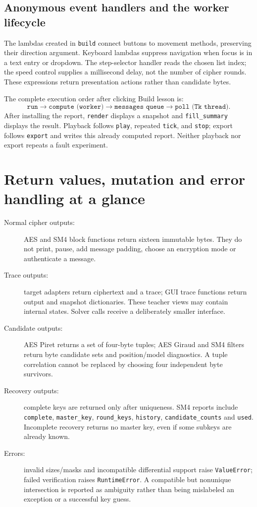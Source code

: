 \subsection{Anonymous event handlers and the worker lifecycle}
The lambdas created in \texttt{build} connect buttons to movement methods, preserving their direction argument. Keyboard lambdas suppress navigation when focus is in a text entry or dropdown. The step-selector handler reads the chosen list index; the speed control supplies a millisecond delay, not the number of cipher rounds. These expressions return presentation actions rather than candidate bytes.

The complete execution order after clicking Build lesson is:
\[
\texttt{run} \longrightarrow \texttt{compute (worker)} \longrightarrow
\texttt{messages queue} \longrightarrow \texttt{poll (Tk thread)}.
\]
After installing the report, \texttt{render} displays a snapshot and \texttt{fill\_\allowbreak{}summary} displays the result. Playback follows \texttt{play}, repeated \texttt{tick}, and \texttt{stop}; export follows \texttt{export} and writes this already computed report. Neither playback nor export repeats a fault experiment.

\section{Return values, mutation and error handling at a glance}
\begin{description}
\item[Normal cipher outputs:] AES and SM4 block functions return sixteen immutable bytes. They do not print, pause, add message padding, choose an encryption mode or authenticate a message.
\item[Trace outputs:] target adapters return ciphertext and a trace; GUI trace functions return output and snapshot dictionaries. These teacher views may contain internal states. Solver calls receive a deliberately smaller interface.
\item[Candidate outputs:] AES Piret returns a set of four-byte tuples; AES Giraud and SM4 filters return byte candidate sets and position/model diagnostics. A tuple correlation cannot be replaced by choosing four independent byte survivors.
\item[Recovery outputs:] complete keys are returned only after uniqueness. SM4 reports include \texttt{complete}, \texttt{master\_\allowbreak{}key}, \texttt{round\_\allowbreak{}keys}, \texttt{history}, \texttt{candidate\_\allowbreak{}counts} and \texttt{used}. Incomplete recovery returns no master key, even if some subkeys are already known.
\item[Errors:] invalid sizes/masks and incompatible differential support raise \texttt{ValueError}; failed verification raises \texttt{RuntimeError}. A compatible but nonunique intersection is reported as ambiguity rather than being mislabeled an exception or a successful key guess.
\end{description}
